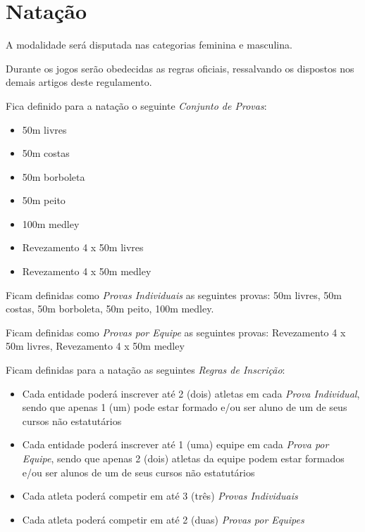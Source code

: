 {\let\clearpage\relax \chapter{Natação}}

\begin{article}
	A modalidade será disputada nas categorias feminina e masculina.
\end{article}

\begin{article}
	Durante os jogos serão obedecidas as regras oficiais, ressalvando os dispostos nos demais artigos deste regulamento.

	Fica definido para a natação o seguinte \textit{Conjunto de Provas}:
	\begin{itemize}[noitemsep]
		\item 50m livres
		\item 50m costas
		\item 50m borboleta
		\item 50m peito
		\item 100m medley
		\item Revezamento 4 x 50m livres
		\item Revezamento 4 x 50m medley
	\end{itemize}

	\begin{xparagraph}
		Ficam definidas como \textit{Provas Individuais} as seguintes provas: 50m livres, 50m costas, 50m borboleta, 50m peito, 100m medley.
	\end{xparagraph}

	\begin{xparagraph}
		Ficam definidas como \textit{Provas por Equipe} as seguintes provas: Revezamento 4 x 50m livres, Revezamento 4 x 50m medley
	\end{xparagraph}
\end{article}

\noindent
Ficam definidas para a natação as seguintes \textit{Regras de Inscrição}:
\begin{itemize}[noitemsep]
	\item Cada entidade poderá inscrever até 2 (dois) atletas em cada \textit{Prova Individual}, sendo que apenas 1 (um) pode estar formado e/ou ser aluno de um de seus cursos não estatutários
	\item Cada entidade poderá inscrever até 1 (uma) equipe em cada \textit{Prova por Equipe}, sendo que apenas 2 (dois) atletas da equipe podem estar formados e/ou ser alunos de um de seus cursos não estatutários
	\item Cada atleta poderá competir em até 3 (três) \textit{Provas Individuais}
	\item Cada atleta poderá competir em até 2 (duas) \textit{Provas por Equipes}
\end{itemize}

